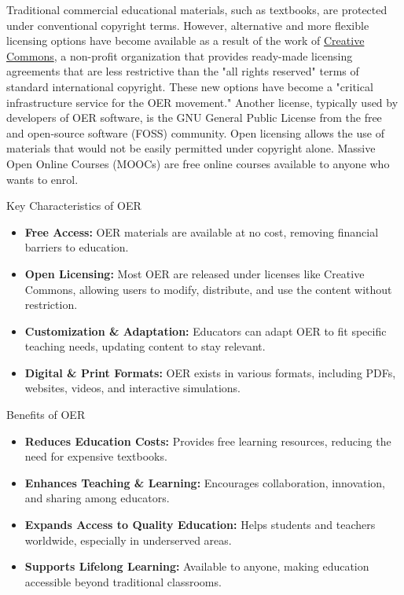\documentclass[a4paper,11pt]{article}
\begin{document}
Traditional commercial educational materials, such as textbooks, are protected under conventional copyright terms. However, alternative and more flexible licensing options have become available as a result of the work of \href{https://en.wikipedia.org/wiki/Creative_Commons}{Creative Commons}, a non-profit organization that provides ready-made licensing agreements that are less restrictive than the "all rights reserved" terms of standard international copyright. These new options have become a "critical infrastructure service for the OER movement." Another license, typically used by developers of OER software, is the GNU General Public License from the free and open-source software (FOSS) community. Open licensing allows the use of materials that would not be easily permitted under copyright alone. Massive Open Online Courses (MOOCs) are free online courses available to anyone who wants to enrol.

{Key Characteristics of OER}
\begin{itemize}
	\item \textbf{Free Access:} OER materials are available at no cost, removing financial barriers to education.
	\item \textbf{Open Licensing:} Most OER are released under licenses like Creative Commons, allowing users to modify, distribute, and use the content without restriction.
	\item \textbf{Customization \& Adaptation:} Educators can adapt OER to fit specific teaching needs, updating content to stay relevant.
	\item \textbf{Digital \& Print Formats:} OER exists in various formats, including PDFs, websites, videos, and interactive simulations.
\end{itemize}

{Benefits of OER}
\begin{itemize}
	\item \textbf{Reduces Education Costs:} Provides free learning resources, reducing the need for expensive textbooks.
	\item \textbf{Enhances Teaching \& Learning:} Encourages collaboration, innovation, and sharing among educators.
	\item \textbf{Expands Access to Quality Education:} Helps students and teachers worldwide, especially in underserved areas.
	\item \textbf{Supports Lifelong Learning:} Available to anyone, making education accessible beyond traditional classrooms.
\end{itemize}
\end{document}
